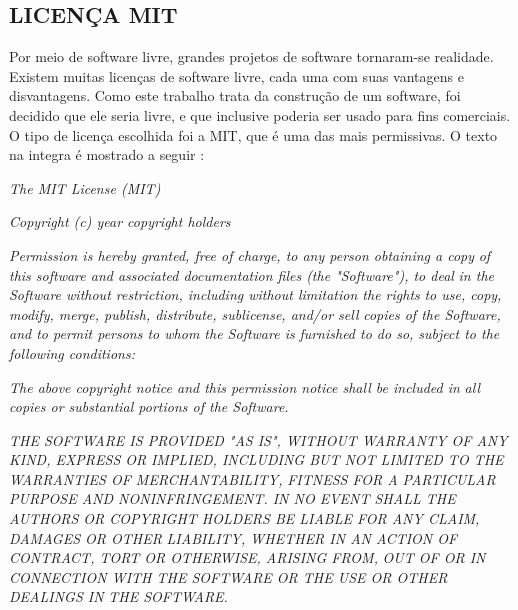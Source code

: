 \subsection{LICENÇA MIT}
\label{mit_sec}

Por meio de software livre, grandes projetos de software tornaram-se realidade. Existem muitas licenças de software livre, cada uma com suas vantagens e disvantagens. Como este trabalho trata da construção de um software, foi decidido que ele seria livre, e que inclusive poderia ser usado para fins comerciais. O tipo de licença escolhida foi a MIT, que é uma das mais permissivas. O texto na integra é mostrado a seguir \cite{MIT2015}:

\begin{citacao}


\emph{The MIT License (MIT)}

\emph{Copyright (c) year copyright holders}

\emph{Permission is hereby granted, free of charge, to any person obtaining a copy}
\emph{of this software and associated documentation files (the "Software"), to deal}
\emph{in the Software without restriction, including without limitation the rights}
\emph{to use, copy, modify, merge, publish, distribute, sublicense, and/or sell}
\emph{copies of the Software, and to permit persons to whom the Software is}
\emph{furnished to do so, subject to the following conditions:}

\emph{The above copyright notice and this permission notice shall be included in}
\emph{all copies or substantial portions of the Software.}

\emph{THE SOFTWARE IS PROVIDED "AS IS", WITHOUT WARRANTY OF ANY KIND, EXPRESS OR}
\emph{IMPLIED, INCLUDING BUT NOT LIMITED TO THE WARRANTIES OF MERCHANTABILITY,}
\emph{FITNESS FOR A PARTICULAR PURPOSE AND NONINFRINGEMENT. IN NO EVENT SHALL THE}
\emph{AUTHORS OR COPYRIGHT HOLDERS BE LIABLE FOR ANY CLAIM, DAMAGES OR OTHER}
\emph{LIABILITY, WHETHER IN AN ACTION OF CONTRACT, TORT OR OTHERWISE, ARISING FROM,}
\emph{OUT OF OR IN CONNECTION WITH THE SOFTWARE OR THE USE OR OTHER DEALINGS IN}
\emph{THE SOFTWARE.}

\end{citacao}
